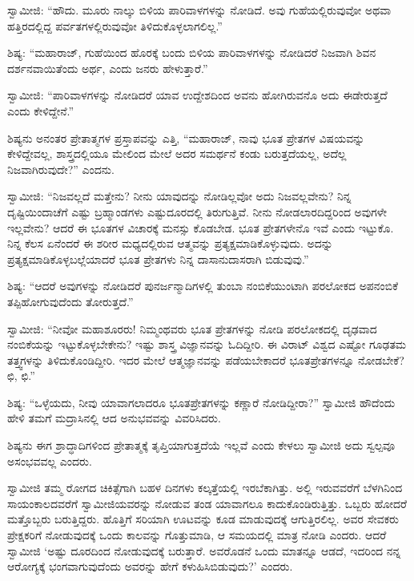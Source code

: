  ಸ್ವಾಮೀಜಿ: “ಹೌದು. ಮೂರು ನಾಲ್ಕು ಬಿಳಿಯ ಪಾರಿವಾಳಗಳನ್ನು ನೋಡಿದೆ. ಅವು ಗುಹೆಯಲ್ಲಿರುವುವೋ ಅಥವಾ ಹತ್ತಿರದಲ್ಲಿದ್ದ ಪರ್ವತಗಳಲ್ಲಿರುವುವೋ‌ ತಿಳಿದುಕೊಳ್ಳಲಾಗಲಿಲ್ಲ.” 

 ಶಿಷ್ಯ: “ಮಹಾರಾಜ್, ಗುಹೆಯಿಂದ ಹೊರಕ್ಕೆ ಬಂದು ಬಿಳಿಯ ಪಾರಿವಾಳಗಳನ್ನು ನೋಡಿದರೆ ನಿಜವಾಗಿ ಶಿವನ ದರ್ಶನವಾಯಿತೆಂದು ಅರ್ಥ, ಎಂದು ಜನರು ಹೇಳುತ್ತಾರೆ.” 

 ಸ್ವಾಮೀಜಿ: “ಪಾರಿವಾಳಗಳನ್ನು ನೋಡಿದರೆ ಯಾವ ಉದ್ದೇಶದಿಂದ ಅವನು ಹೋಗಿರುವನೊ ಅದು ಈಡೇರುತ್ತದೆ ಎಂದು ಕೇಳಿದ್ದೇನೆ.” 

 ಶಿಷ್ಯನು ಅನಂತರ ಪ್ರೇತಾತ್ಮಗಳ ಪ್ರಸ್ತಾಪವನ್ನು ಎತ್ತಿ, “ಮಹಾರಾಜ್, ನಾವು ಭೂತ ಪ್ರೇತಗಳ ವಿಷಯವನ್ನು ಕೇಳಿದ್ದೇವಲ್ಲ, ಶಾಸ್ತ್ರದಲ್ಲಿಯೂ ಮೇಲಿಂದ ಮೇಲೆ ಅದರ ಸಮರ್ಥನೆ ಕಂಡು ಬರುತ್ತದೆಯಲ್ಲ, ಅದೆಲ್ಲ ನಿಜವಾಗಿರುವುದೇ?” ಎಂದನು. 

 ಸ್ವಾಮೀಜಿ: “ನಿಜವಲ್ಲದೆ ಮತ್ತೇನು? ನೀನು ಯಾವುದನ್ನು ನೋಡಿಲ್ಲವೋ ಅದು ನಿಜವಲ್ಲವೇನು? ನಿನ್ನ ದೃಷ್ಟಿಯಿಂದಾಚೆಗೆ ಎಷ್ಟು ಬ್ರಹ್ಮಾಂಡಗಳು ಎಷ್ಟು\break ದೂರದಲ್ಲಿ ತಿರುಗುತ್ತಿವೆ. ನೀನು ನೋಡಲಾರದಿದ್ದರಿಂದ ಅವುಗಳೇ ಇಲ್ಲವೇನು? ಆದರೆ ಈ ಭೂತಗಳ ವಿಚಾರಕ್ಕೆ ಮನಸ್ಸು ಕೊಡಬೇಡ. ಭೂತ ಪ್ರೇತಗಳೇನೊ ಇವೆ ಎಂದು ಇಟ್ಟುಕೊ. ನಿನ್ನ ಕೆಲಸ ಏನೆಂದರೆ ಈ ಶರೀರ ಮಧ್ಯದಲ್ಲಿರುವ ಆತ್ಮವನ್ನು ಪ್ರತ್ಯಕ್ಷಮಾಡಿಕೊಳ್ಳುವುದು. ಅದನ್ನು ಪ್ರತ್ಯಕ್ಷಮಾಡಿಕೊಳ್ಳಬಲ್ಲೆಯಾದರೆ ಭೂತ ಪ್ರೇತಗಳು ನಿನ್ನ ದಾಸಾನುದಾಸರಾಗಿ ಬಿಡುವುವು.” 

 ಶಿಷ್ಯ: “ಆದರೆ ಅವುಗಳನ್ನು ನೋಡಿದರೆ ಪುನರ್ಜನ್ಮಾದಿಗಳಲ್ಲಿ ತುಂಬಾ ನಂಬಿಕೆಯುಂಟಾಗಿ ಪರಲೋಕದ ಅಪನಂಬಿಕೆ ತಪ್ಪಿಹೋಗುವುದೆಂದು ತೋರುತ್ತದೆ.” 

 ಸ್ವಾಮೀಜಿ: “ನೀವೋ ಮಹಾಶೂರರು! ನಿಮ್ಮಂಥವರು ಭೂತ ಪ್ರೇತಗಳನ್ನು ನೋಡಿ ಪರಲೋಕದಲ್ಲಿ ದೃಢವಾದ ನಂಬಿಕೆಯನ್ನು ಇಟ್ಟುಕೊಳ್ಳಬೇಕೇನು? ಇಷ್ಟು ಶಾಸ್ತ್ರ ವಿಜ್ಞಾನವನ್ನು ಓದಿದ್ದೀರಿ. ಈ ವಿರಾಟ್ ವಿಶ್ವದ ಎಷ್ಟೋ ಗೂಢತಮ ತತ್ತ್ವಗಳನ್ನು ತಿಳಿದುಕೊಂಡಿದ್ದೀರಿ. ಇದರ ಮೇಲೆ ಆತ್ಮಜ್ಞಾನವನ್ನು ಪಡೆಯಬೇಕಾದರೆ ಭೂತಪ್ರೇತಗಳನ್ನೂ ನೋಡಬೇಕೆ? ಛಿ, ಛಿ.” 

 ಶಿಷ್ಯ: “ಒಳ್ಳೆಯದು, ನೀವು ಯಾವಾಗಲಾದರೂ ಭೂತಪ್ರೇತಗಳನ್ನು ಕಣ್ಣಾರೆ ನೋಡಿದ್ದೀರಾ?” ಸ್ವಾಮೀಜಿ ಹೌದೆಂದು ಹೇಳಿ ತಮಗೆ ಮದ್ರಾಸಿನಲ್ಲಿ ಆದ ಅನುಭವವನ್ನು ವಿವರಿಸಿದರು. 

 ಶಿಷ್ಯನು ಈಗ ಶ್ರಾದ್ಧಾದಿಗಳಿಂದ ಪ್ರೇತಾತ್ಮಕ್ಕೆ ತೃಪ್ತಿಯಾಗುತ್ತದೆಯೆ ಇಲ್ಲವೆ ಎಂದು ಕೇಳಲು ಸ್ವಾಮೀಜಿ ಅದು ಸ್ವಲ್ಪವೂ ಅಸಂಭವವಲ್ಲ ಎಂದರು. 

 ಸ್ವಾಮೀಜಿ ತಮ್ಮ ರೋಗದ ಚಿಕಿತ್ಸೆಗಾಗಿ ಬಹಳ ದಿನಗಳು ಕಲ್ಕತ್ತೆಯಲ್ಲಿ ಇರಬೆಕಾಗಿತ್ತು. ಅಲ್ಲಿ ಇರುವವರೆಗೆ ಬೆಳಗಿನಿಂದ ಸಾಯಂಕಾಲದವರೆಗೆ ಸ್ವಾಮೀಜಿಯವರನ್ನು ನೋಡುವ ತಂಡ ಯಾವಾಗಲೂ ಕಾದುಕೊಂಡಿರುತ್ತಿತ್ತು. ಒಬ್ಬರು ಹೋದರೆ ಮತ್ತೊಬ್ಬರು ಬರುತ್ತಿದ್ದರು. ಹೊತ್ತಿಗೆ ಸರಿಯಾಗಿ ಊಟವನ್ನು ಕೂಡ ಮಾಡುವುದಕ್ಕೆ ಆಗುತ್ತಿರಲಿಲ್ಲ. ಅವರ ಸೇವಕರು ಪ್ರೇಕ್ಷಕರಿಗೆ ನೋಡುವುದಕ್ಕೆ ಒಂದು ಕಾಲವನ್ನು ಗೊತ್ತುಮಾಡಿ, ಆ ಸಮಯದಲ್ಲಿ ಮಾತ್ರ ನೋಡಿ ಎಂದರು. ಆದರೆ ಸ್ವಾಮೀಜಿ ‘ಅಷ್ಟು ದೂರದಿಂದ ನೋಡುವುದಕ್ಕೆ ಬರುತ್ತಾರೆ. ಅವರೊಡನೆ ಒಂದು ಮಾತನ್ನೂ ಆಡದೆ, ಇದರಿಂದ ನನ್ನ ಆರೋಗ್ಯಕ್ಕೆ ಭಂಗವಾಗುವುದೆಂದು ಅವರನ್ನು ಹೇಗೆ ಕಳುಹಿಸಿಬಿಡುವುದು?’ ಎಂದರು. 

